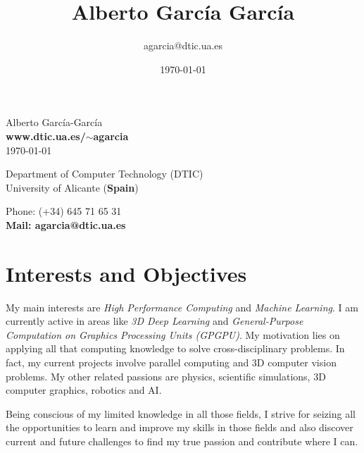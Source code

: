\documentclass[8pt]{article}
\title{\bfseries\Huge Alberto García García}
\author{agarcia@dtic.ua.es}
\date{\today}
\begin{document}
\begin{center}
	\Huge Alberto García-García\\
	\Large \textbf{www.dtic.ua.es/$\sim$agarcia}\\
	\today
\end{center}
\bigskip
\begin{minipage}[ht]{0.65\textwidth}
Department of Computer Technology (DTIC)\\
University of Alicante (\textbf{Spain})\\
\end{minipage}
\hfill
\begin{minipage}[ht]{0.3\textwidth}
Phone: (+34) 645 71 65 31\\
\textbf{Mail: agarcia@dtic.ua.es}\\
\end{minipage}
 
\section*{Interests and Objectives}

My main interests are \emph{High Performance Computing} and \emph{Machine Learning}. I am currently active in areas like \emph{3D Deep Learning} and \emph{General-Purpose Computation on Graphics Processing Units (GPGPU)}. My motivation lies on applying all that computing knowledge to solve cross-disciplinary problems. In fact, my current projects involve parallel computing and 3D computer vision problems. My other related passions are physics, scientific simulations, 3D computer graphics, robotics and AI.

Being conscious of my limited knowledge in all those fields, I strive for seizing all the opportunities to learn and improve my skills in those fields and also discover current and future challenges to find my true passion and contribute where I can.
 
\end{document}

